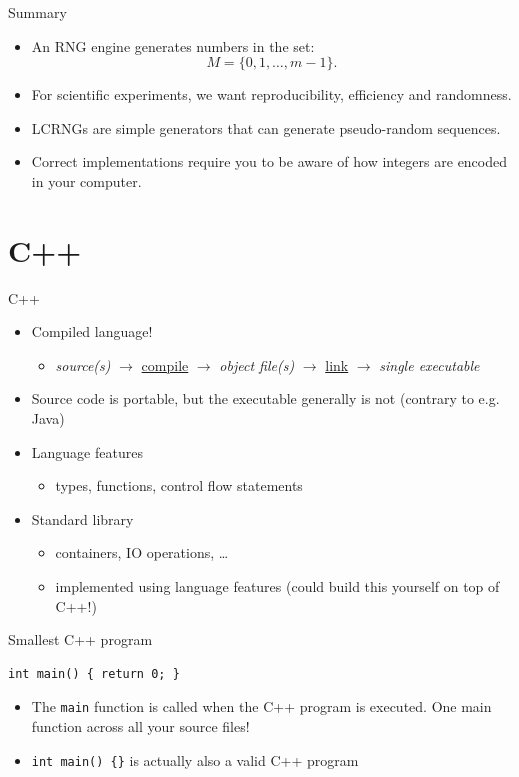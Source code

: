\documentclass[10pt]{beamer}
\begin{document}
\begin{frame}[label={sec:org281f3fd}]{Summary}
\begin{itemize}
\item An \alert{RNG engine} generates numbers in the set:
$$M = \{0, 1, \ldots, m - 1\}.$$
\item For \alert{scientific experiments}, we want reproducibility, efficiency and
randomness.
\item \alert{LCRNGs} are simple generators that can generate pseudo-random
sequences.
\item Correct implementations require you to be aware of how integers are \alert{encoded} in
your computer.
\end{itemize}
\end{frame}
\section{C++}
\label{sec:org28a0a2e}
\begin{frame}[label={sec:org5bcbf13}]{C++}
\begin{itemize}
\item Compiled language!
\begin{itemize}
\item \emph{source(s)} \(\to\) \alert{\uline{compile}} \(\to\) \emph{object file(s)} \(\to\) \alert{\uline{link}} \(\to\) \emph{single executable}
\end{itemize}
\item Source code is portable, but the executable generally is not (contrary to e.g. Java)
\item \alert{Language features}
\begin{itemize}
\item types, functions, control flow statements
\end{itemize}
\item \alert{Standard library}
\begin{itemize}
\item containers, IO operations, \ldots{}
\item implemented using language features (could build this yourself on top of C++!)
\end{itemize}
\end{itemize}
\end{frame}
\begin{frame}[fragile,label={sec:org7d46256}]{Smallest C++ program}
 \begin{verbatim}
int main() { return 0; }
\end{verbatim}

\begin{itemize}
\item The \texttt{main} function is called when the C++ program is executed. One main function across all your source files!

\item \texttt{int main() \{\}} is actually also a valid C++ program
\end{itemize}
\end{frame}
\end{document}
